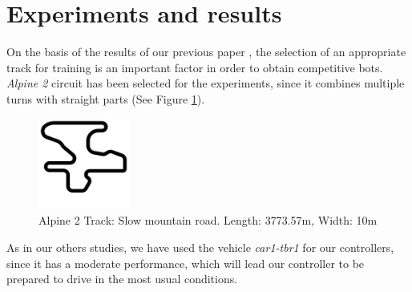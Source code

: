 \documentclass[conference]{IEEEtran}
\begin{document}



 



\section{Experiments and results}  
\label{sec:results}


On the basis of the results of our previous paper \cite{salem_cig2018}, the selection of an appropriate track for training is an important factor in order to obtain competitive bots. \textit{Alpine 2} circuit has been selected for the experiments, since it combines multiple turns with straight parts (See Figure \ref{fig:alpine2_track}).

\begin{figure}[!ht]	
  \begin{center}
    \includegraphics[width=3cm]{fig/alpine2.jpg}
    \caption{Alpine 2 Track: Slow mountain road. Length: 3773.57m, Width: 10m}
    \label{fig:alpine2_track}	
  \end{center}	
\end{figure}

As in our others studies, we have used the vehicle \textit{car1-tbr1} for our controllers, since it has a moderate performance, which will lead our controller to be prepared to drive in the most usual conditions.
\end{document}
